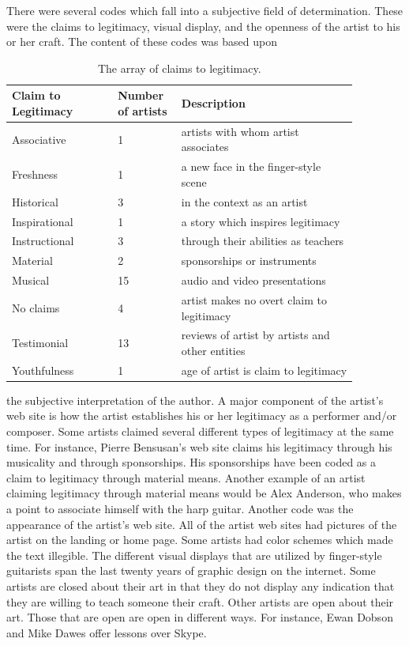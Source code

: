 \documentclass[unicode,hyperfootnotes=false,xetex,colorlinks=true,nofonts,nobib]{tufte-handout}
\begin{document}
There were several codes which fall into a subjective field of determination. These were the claims to legitimacy, visual display, and the openness of the artist to his or her craft. The content of these codes was based upon
\begin{table}
  \centering
  \small
  \begin{tabular}{p{0.27\linewidth}p{0.15\linewidth}p{0.45\linewidth}}\toprule
    Claim to Legitimacy & Number of artists & Description \\\midrule
    Associative & 1 & artists with whom artist associates \\
    Freshness & 1 & a new face in the finger-style scene \\
    Historical & 3 & in the context as an artist \\
    Inspirational & 1 & a story which inspires legitimacy \\
    Instructional & 3 & through their abilities as teachers \\
    Material & 2 & sponsorships or instruments \\
    Musical & 15 & audio and video presentations \\
    No claims & 4 & artist makes no overt claim to legitimacy \\
    Testimonial & 13 & reviews of artist by artists and other entities \\
    Youthfulness & 1 & age of artist is claim to legitimacy \\
      \bottomrule
  \end{tabular}
  \caption{The array of claims to legitimacy.}
\end{table}
the subjective interpretation of the author. A major component of the artist's web site is how the artist establishes his or her legitimacy as a performer and/or composer. Some artists claimed several different types of legitimacy at the same time. For instance, Pierre Bensusan's web site claims his legitimacy through his musicality and through sponsorships. His sponsorships have been coded as a claim to legitimacy through material means. Another example of an artist claiming legitimacy through material means would be Alex Anderson, who makes a point to associate himself with the harp guitar. Another code was the appearance of the artist's web site. All of the artist web sites had pictures of the artist on the landing or home page. Some artists had color schemes which made the text illegible. The different visual displays that are utilized by finger-style guitarists span the last twenty years of graphic design on the internet. Some artists are closed about their art in that they do not display any indication that they are willing to teach someone their craft. Other artists are open about their art. Those that are open are open in different ways. For instance, Ewan Dobson and Mike Dawes offer lessons over Skype.
\end{document}
